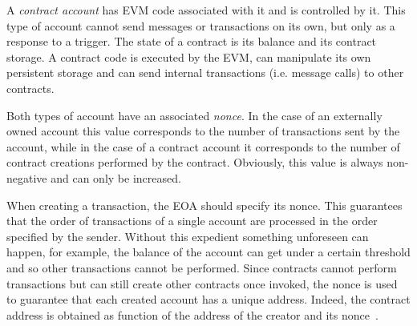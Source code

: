 A \emph{contract account} has EVM code associated with it and is controlled by
it. This type of account cannot send messages or transactions on its own, but
only as a response to a trigger. The state of a contract is its balance and its
contract storage. A contract code is executed by the EVM, can manipulate its own
persistent storage and can send internal transactions (i.e. message calls) to
other contracts.

Both types of account have an associated \emph{nonce}. In the case of an
externally owned account this value corresponds to the number of transactions
sent by the account, while in the case of a contract account it corresponds to
the number of contract creations performed by the contract. Obviously, this
value is always non-negative and can only be increased.

When creating a transaction, the EOA should specify its nonce. This guarantees
that the order of transactions of a single account are processed in the order
specified by the sender. Without this expedient something unforeseen can happen,
for example, the balance of the account can get under a certain threshold and so
other transactions cannot be performed. Since contracts cannot perform
transactions but can still create other contracts once invoked, the nonce is
used to guarantee that each created account has a unique address. Indeed, the
contract address is obtained as function of the address of the creator and its
nonce~\cite{wood2018ethereum}.
